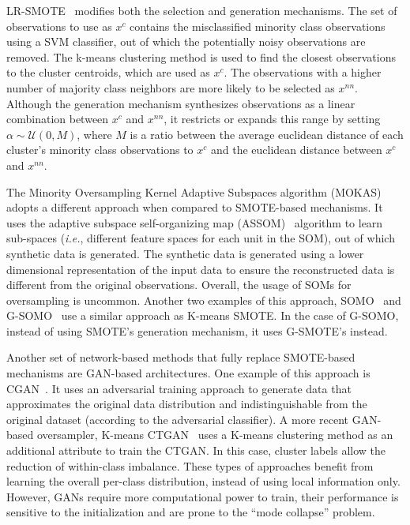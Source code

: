 \documentclass[parskip=full]{scrartcl}
\begin{document}
LR-SMOTE~\cite{liang2020lr} modifies both the selection and generation
mechanisms. The set of observations to use as $x^c$ contains the misclassified
minority class observations using a SVM classifier, out of which the
potentially noisy observations are removed. The k-means clustering method is
used to find the closest observations to the cluster centroids, which are used
as $x^c$. The observations with a higher number of majority class neighbors
are more likely to be selected as $x^{nn}$. Although the generation mechanism
synthesizes observations as a linear combination between $x^c$ and $x^{nn}$,
it restricts or expands this range by setting $\alpha \sim \mathcal{U}(0, M)$,
where $M$ is a ratio between the average euclidean distance of each cluster's
minority class observations to $x^c$ and the euclidean distance between $x^c$
and $x^{nn}$.

The Minority Oversampling Kernel Adaptive Subspaces algorithm
(MOKAS)~\cite{lin2017minority} adopts a different approach when compared to
SMOTE-based mechanisms. It uses the adaptive subspace self-organizing map
(ASSOM)~\cite{kohonen1996emergence} algorithm to learn sub-spaces
(\textit{i.e.}, different feature spaces for each unit in the SOM), out of
which synthetic data is generated. The synthetic data is generated using a
lower dimensional representation of the input data to ensure the reconstructed
data is different from the original observations. Overall, the usage of SOMs
for oversampling is uncommon. Another two examples of this approach,
SOMO~\cite{douzas2017self} and G-SOMO~\cite{douzas2021g} use a similar
approach as K-means SMOTE\@. In the case of G-SOMO, instead of using SMOTE's
generation mechanism, it uses G-SMOTE's instead.

Another set of network-based methods that fully replace SMOTE-based mechanisms
are GAN-based architectures. One example of this approach is
CGAN~\cite{douzas2018effective}. It uses an adversarial training approach to
generate data that approximates the original data distribution and
indistinguishable from the original dataset (according to the adversarial
classifier). A more recent GAN-based oversampler, K-means CTGAN~\cite{an2021k}
uses a K-means clustering method as an additional attribute to train the
CTGAN\@. In this case, cluster labels allow the reduction of within-class
imbalance. These types of approaches benefit from learning the overall
per-class distribution, instead of using local information only. However, GANs
require more computational power to train, their performance is sensitive to
the initialization and are prone to the ``mode collapse'' problem.
\end{document}
